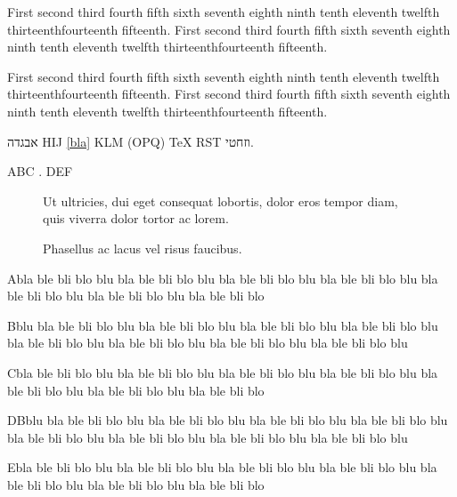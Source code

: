 \documentclass[a4paper]{book}
\begin{document}
{\raggedright First second third fourth fifth sixth seventh eighth
ninth tenth eleventh twelfth thirteenthfourteenth fifteenth. First
second third fourth fifth sixth seventh eighth ninth tenth eleventh
twelfth thirteenthfourteenth fifteenth.\par}

\bigskip

{\raggedleft First second third fourth fifth sixth seventh eighth
ninth tenth eleventh twelfth thirteenthfourteenth fifteenth. First
second third fourth fifth sixth seventh eighth ninth tenth eleventh
twelfth thirteenthfourteenth fifteenth.\par}

\bigskip

אבגדה HIJ \ref{bla} KLM \thetable{} (OPQ) \TeX{} RST וזחטי.

ABC . DEF

\begin{figure}
\centering
{}
\caption{Ut ultricies, dui eget consequat lobortis, dolor eros tempor
diam, quis viverra dolor tortor ac lorem.}
\end{figure}

\begin{figure}
\centering
{}
\caption{Phasellus ac lacus vel risus faucibus.}
\end{figure}


Abla ble bli blo blu bla ble bli blo blu bla ble bli blo blu bla ble
bli blo blu bla ble bli blo blu bla ble bli blo blu bla ble bli blo

Bblu bla ble bli blo blu bla ble bli blo blu bla ble bli blo blu bla
ble bli blo blu bla ble bli blo blu bla ble bli blo blu bla ble bli
blo blu bla ble bli blo blu

Cbla ble bli blo blu bla ble bli blo blu bla ble bli blo blu bla ble
bli blo blu bla ble bli blo blu bla ble bli blo blu bla ble bli blo

DBblu bla ble bli blo blu bla ble bli blo blu bla ble bli blo blu bla
ble bli blo blu bla ble bli blo blu bla ble bli blo blu bla ble bli
blo blu bla ble bli blo blu

Ebla ble bli blo blu bla ble bli blo blu bla ble bli blo blu bla ble
bli blo blu bla ble bli blo blu bla ble bli blo blu bla ble bli blo
\end{document}
